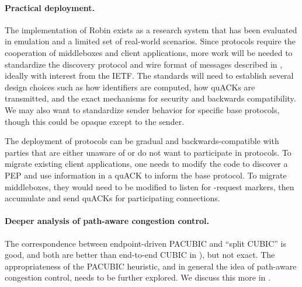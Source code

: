 


\paragraph{Practical deployment.}

The implementation of Robin exists as a research system that has been evaluated
in emulation and a limited set of real-world scenarios. Since \sys protocols
require the cooperation of middleboxes and client applications, more work will
be needed to standardize the discovery protocol and wire format of \sys messages
described in , ideally with interest from the IETF.
The standards will need to establish several design choices such as how
identifiers are computed, how quACKs are transmitted, and the exact mechanisms
for security and backwards compatibility.
We may also want to standardize sender behavior for specific base protocols,
though this could be opaque except to the sender.

The deployment of \sys protocols can be gradual and backwards-compatible
with parties that are either unaware of or do not want to participate in \sys
protocols.
To migrate existing client applications, one needs to modify the code to
discover a PEP and use information in a quACK to inform the base protocol.
To migrate middleboxes, they would need to be modified to listen for
\sys-request markers, then accumulate and send quACKs for participating
connections.


\paragraph{Deeper analysis of path-aware congestion control.}

The correspondence between endpoint-driven PACUBIC and ``split CUBIC''
is good, and both are better than end-to-end CUBIC in
), but not exact. The appropriateness of the
PACUBIC heuristic, and in general the idea of path-aware congestion
control, needs to be further explored. We discuss this more in
.

